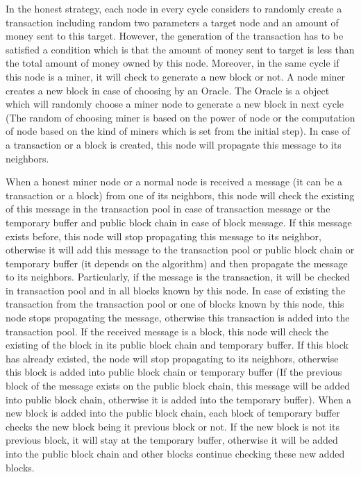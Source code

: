 \documentclass[runningheads,a4paper]{llncs}
\begin{document}
In the honest strategy, each node in every cycle considers to randomly create a transaction including random two parameters a target node and an amount of money sent to this target.
However, the generation of the transaction has to be satisfied a condition which is that the amount of money sent to target is less than the total amount of money owned by this node.
Moreover, in the same cycle if this node is a miner, it will check to generate a new block or not. A node miner creates a new block in case of choosing by an Oracle. The Oracle is a object which will randomly choose a miner node to generate a new block in next cycle (The random of choosing miner is based on the power of node or the computation of node based on the kind of miners which is set from the initial step).
In case of a transaction or a block is created, this node will propagate this message to its neighbors.

When a honest miner node or a normal node is received a message (it can be a transaction or a block) from one of its neighbors, this node will check the existing of this message in the transaction pool in case of transaction message or the temporary buffer and public block chain in case of block message.
If this message exists before, this node will stop propagating this message to its neighbor, otherwise it will add this message to the transaction pool or public block chain or temporary buffer (it depends on the algorithm) and then propagate the message to its neighbors. Particularly, if the message is the transaction, it will be checked in transaction pool and in all blocks known by this node. In case of existing the transaction from the transaction pool or one of blocks known by this node, this node stops propagating the message, otherwise this transaction is added into the transaction pool.
If the received message is a block, this node will check the existing of the block in its public block chain and temporary buffer. If this block has already existed, the node will stop propagating to its neighbors, otherwise this block is added into public block chain or temporary buffer (If the previous block of the message exists on the public block chain, this message will be added into public block chain, otherwise it is added into the temporary buffer).
When a new block is added into the public block chain, each block of temporary buffer checks the new block being it previous block or not. If the new block is not its previous block, it will stay at the temporary buffer, otherwise it will be added into the public block chain and other blocks continue checking these new added blocks.
\end{document}

